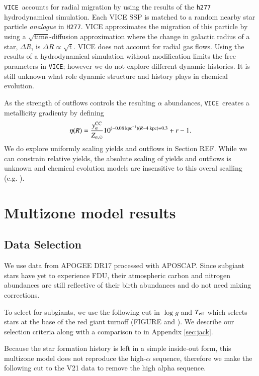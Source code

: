\documentclass[12pt,oneside]{report}
\newcommand{\VICE}{\texttt{VICE}}
\begin{document}
\VICE\ accounts for radial migration by using the results of the \texttt{h277} hydrodynamical simulation. Each VICE SSP is matched to a random nearby star particle \textit{analogue} in \texttt{H277}. VICE approximates the migration of this particle by using a $\sqrt{\text{time}}$-diffusion approximation where the change in galactic radius of a star, $\Delta R$, is $\Delta R \propto \sqrt{\text{t}}$. 
VICE does not account for radial gas flows. 
Using the results of a hydrodynamical simulation without modification limits the free parameters in \VICE; however we do not explore different dynamic histories. It is still unknown what role dynamic structure and history plays in chemical evolution.

As the strength of outflows controls the resulting $\alpha$ abundances, \VICE~creates a metallicity gradienty by defining
\begin{equation}
\eta(R) = \frac{y_{\alpha}^{\rm CC}}{Z_{\alpha, \odot}} 10^{(-0.08\text{ kpc}^{-1})(R-4\text{ kpc})+0.3} + r - 1.
\end{equation}
We do explore uniformly scaling yields and outflows in Section REF. While we can constrain relative yields, the absolute scaling of yields and outflows is unknown and chemical evolution models are insensitive to this overal scalling (e.g. \cite{james_dwarf}).


\chapter{Multizone model results}
\section{Data Selection}

We use data from APOGEE DR17 \citep{apogee17} processed with APOSCAP. Since subgiant stars have yet to experience FDU, their atmospheric carbon and nitrogen abundances are still reflective of their birth abundances and do not need mixing corrections. 

To select for subgiants, we use the following cut in $\log g$ and $T_{\rm eff}$
which selects stars at the base of the red giant turnoff (FIGURE and
\cite{jack_subgiant}). We describe our selection criteria along with a 
comparison to \citet{fiorenzo+21} in Appendix \ref{sec:jack}. 

Because the star formation history is left in a simple inside-out form, this multizone model does not reproduce the high-$\alpha$ sequence, therefore we make the following cut to the V21 data to remove the high alpha sequence.
\end{document}
